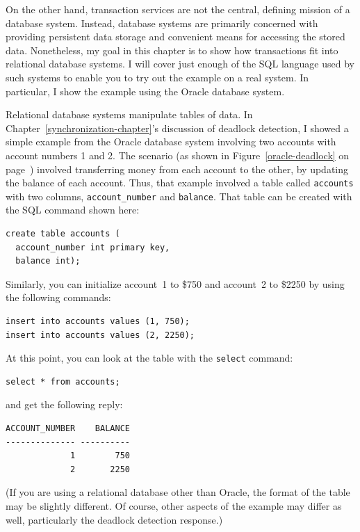 On the other hand, transaction services are not the central, defining
mission of a database system.  Instead, database systems are primarily
concerned with providing persistent data storage and convenient means
for accessing the stored data.  Nonetheless, my goal in this chapter is to show how transactions fit
into relational database systems.  I will cover just enough of the SQL
language used by such systems to enable you to try out the example on
a real system.  In particular, I show the example using the Oracle
database system.

Relational database systems manipulate tables of data.  In Chapter~\ref{synchronization-chapter}'s
discussion of deadlock detection, I showed a
simple example from the Oracle database system involving two
accounts with account numbers 1 and 2.  The scenario
(as shown in Figure~\ref{oracle-deadlock} on
page~\pageref{oracle-deadlock}) involved transferring money from each
account to the other, by updating the balance of each account.  Thus,
that example involved a table called \verb|accounts| with two columns,
\verb|account_number| and \verb|balance|.  That table can be created
with the SQL command shown here:
\begin{verbatim}
create table accounts (
  account_number int primary key,
  balance int);
\end{verbatim}
Similarly, you can initialize account~1 to \$750 and account~2 to
\$2250 by using the following commands:
\begin{verbatim}
insert into accounts values (1, 750);
insert into accounts values (2, 2250);
\end{verbatim}
At this point, you can look at the table with the \verb|select| command:
\begin{verbatim}
select * from accounts;
\end{verbatim}
and get the following reply:
\begin{verbatim}
ACCOUNT_NUMBER    BALANCE                                                       
-------------- ----------                                                       
             1        750                                                       
             2       2250                                                       
\end{verbatim}
(If you are using a relational database other than Oracle, the format
of the table may be slightly different.  Of course, other aspects of
the example may differ as well, particularly the deadlock detection
response.)

